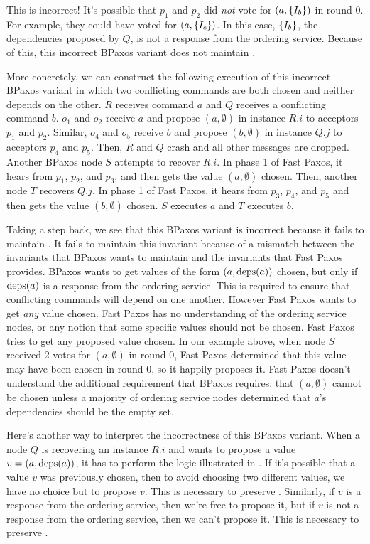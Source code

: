 This is incorrect! It's possible that $p_1$ and $p_2$ did \emph{not} vote for
$(a, \{I_b\})$ in round $0$. For example, they could have voted for $(a,
\{I_c\})$. In this case, $\{I_b\}$, the dependencies proposed by $Q$, is
not a response from the ordering service. Because of this, this incorrect
BPaxos variant does not maintain .

More concretely, we can construct the following execution of this incorrect
BPaxos variant in which two conflicting commands are both chosen and neither
depends on the other. $R$ receives command $a$ and $Q$ receives a conflicting
command $b$.  $o_1$ and $o_2$ receive $a$ and propose $(a, \emptyset)$ in
instance $R.i$ to acceptors $p_1$ and $p_2$. Similar, $o_4$ and $o_5$ receive
$b$ and propose $(b, \emptyset)$ in instance $Q.j$ to acceptors $p_4$ and
$p_5$. Then, $R$ and $Q$ crash and all other messages are dropped. Another
BPaxos node $S$ attempts to recover $R.i$. In phase 1 of Fast Paxos, it hears
from $p_1$, $p_2$, and $p_3$, and then gets the value $(a, \emptyset)$ chosen.
Then, another node $T$ recovers $Q.j$. In phase 1 of Fast Paxos, it hears from
$p_3$, $p_4$, and $p_5$ and then gets the value $(b, \emptyset)$ chosen. $S$
executes $a$ and $T$ executes $b$.

Taking a step back, we see that this BPaxos variant is incorrect because it
fails to maintain . It fails to maintain this
invariant because of a mismatch between the invariants that BPaxos wants to
maintain and the invariants that Fast Paxos provides. BPaxos wants to get
values of the form $(a, \text{deps}(a))$ chosen, but only if $\text{deps}(a)$ is a response
from the ordering service. This is required to ensure that conflicting commands
will depend on one another. However Fast Paxos wants to get \emph{any} value
chosen. Fast Paxos has no understanding of the ordering service nodes, or any
notion that some specific values should not be chosen. Fast Paxos tries to get
any proposed value chosen. In our example above, when node $S$ received 2 votes
for $(a, \emptyset)$ in round 0, Fast Paxos determined that this value may have
been chosen in round 0, so it happily proposes it. Fast Paxos doesn't
understand the additional requirement that BPaxos requires: that $(a,
\emptyset)$ cannot be chosen unless a majority of ordering service nodes
determined that $a$'s dependencies should be the empty set.

Here's another way to interpret the incorrectness of this BPaxos variant. When
a node $Q$ is recovering an instance $R.i$ and wants to propose a value $v =
(a, \text{deps}(a))$, it has to perform the logic illustrated in
.
%
If it's possible that a value $v$ was previously chosen, then to avoid choosing
two different values, we have no choice but to propose $v$. This is necessary
to preserve .
%
Similarly, if $v$ is a response from the ordering service, then we're free to
propose it, but if $v$ is not a response from the ordering service, then we
can't propose it. This is necessary to preserve .

